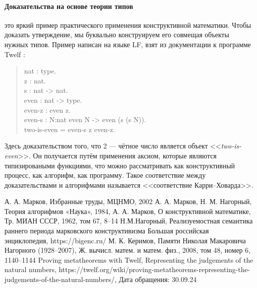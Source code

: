 \documentclass[a4paper,12pt,russian]{article}
\begin{document}
\paragraph{Доказательства на основе теории типов} это яркий пример практического применения конструктивной математики. Чтобы доказать утверждение, мы буквально конструируем его совмещая объекты нужных типов. Пример написан на языке LF, взят из документации к программе Twelf \cite{twelf}:
\begin{quote}
  nat : type.\\
  z : nat.\\
  s : nat -> nat.\\
  even : nat -> type.\\
  even-z : even z.\\
  even-s : {N:nat} even N -> even (s (s N)).\\
  two-is-even = even-s z even-z.
\end{quote}
Здесь доказательством того, что 2 --- чётное число является объект <<\emph{two-is-even}>>. Он получается путём применения аксиом, которые являются типизироваными функциями, что можно рассматривать как конструктивный процесс, как алгорифм, как программу. Такое соответствие между доказательствами и алгорифмами называется <<соответствие Карри–Ховарда>>.

\begin{thebibliography}{9}
  А. А. Марков,
  Избранные труды,
  МЦНМО, 2002
  А. А. Марков, Н. М. Нагорный,
  Теория алгорифмов
  «Наука», 1984, 
  А. А. Марков,
  О конструктивной математике,
  Тр. МИАН СССР, 1962, том 67, 8–14
  Н.М.Нагорный,
  Реализуемостная семантика раннего периода марковского конструктивизма
  Большая российская энциклопедия,
  https://bigenc.ru/
  М. К. Керимов,
  Памяти Николая Макаровича Нагорного (1928–2007),
  Ж. вычисл. матем. и матем. физ., 2008, том 48, номер 6, 1140–1144
  Proving metatheorems with Twelf,
  Representing the judgements of the natural numbers,
  https://twelf.org/wiki/proving-metatheorems-representing-the-judgements-of-the-natural-numbers/,
  Дата обращения: 30.09.24
\end{thebibliography}
\end{document}
